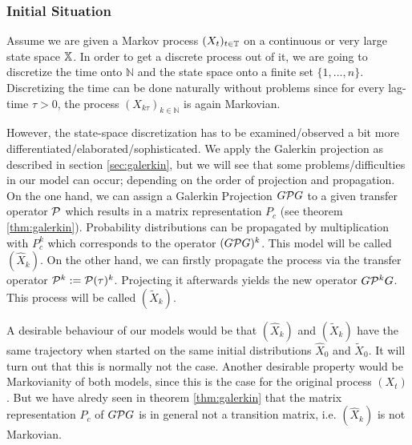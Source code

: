 \subsubsection*{Initial Situation}

Assume we are given a Markov process $(X_t)_{t \in \mathbb{T}}$ on a continuous or very large state space $\mathbb{X}$.
In order to get a discrete process out of it, we are going to discretize the time onto $\mathbb{N}$ and the state space onto a finite set $\{1,\dots,n\}$.
Discretizing the time can be done naturally without problems since for every lag-time $\tau > 0$, the process $(X_{k\tau})_{k\in \mathbb{N}}$ is again Markovian. 

However, the state-space discretization has to be examined/observed a bit more differentiated/elaborated/sophisticated. We apply the Galerkin projection as described in section \ref{sec:galerkin}, but we will see that some problems/difficulties in our model can occur; depending on the order of projection and propagation.
On the one hand, we can assign a Galerkin Projection $G\mathcal{P} G$ to a given transfer operator $\mathcal{P}$ which results in a matrix representation $P_c$ (see theorem \ref{thm:galerkin}).
Probability distributions can be propagated by multiplication with $P_c^k$ which corresponds to the operator $(G\mathcal{P} G)^k$. 
This model will be called $(\widehat{X}_k)$.
On the other hand, we can firstly propagate the process via the transfer operator $\mathcal{P}^k := \mathcal{P}(\tau)^k$. Projecting it afterwards yields the new operator $G\mathcal{P}^k G$.
This process will be called $(\widetilde{X}_k)$.

A desirable behaviour of our models would be that $(\widehat{X}_k)$ and $(\widetilde{X}_k)$ have the same trajectory when started on the same initial distributions $\widehat{X}_0$ and $\widetilde{X}_0$. It will turn out that this is normally not the case.
Another desirable property would be Markovianity of both models, since this is the case for the original process $(X_t)$. But we have alredy seen in theorem \ref{thm:galerkin} that the matrix representation $P_c$ of $G\mathcal{P} G$ is in general not a transition matrix, i.e. 
$(\widehat{X}_k)$ is not Markovian. 

